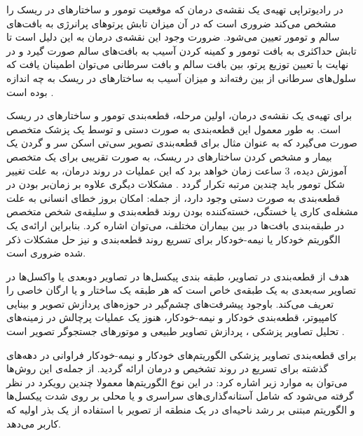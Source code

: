 در رادیوتراپی تهیه‌ی یک نقشه‌ی درمان که موقعیت تومور و ساختارهای در ریسک را مشخص می‌کند ضروری است که در آن میزان تابش پرتوهای پرانرژی به بافت‌های سالم و تومور تعیین می‌شود. ضرورت وجود این نقشه‌ی درمان به این دلیل است تا تابش حداکثری به بافت تومور و کمینه کردن آسیب به بافت‌های سالم صورت گیرد و در نهایت با تعیین توزیع پرتو، بین بافت سالم و بافت سرطانی می‌توان اطمینان یافت که سلول‌های سرطانی از بین رفته‌اند و میزان آسیب به ساختارهای در ریسک به چه اندازه بوده است .

برای تهیه‌ی یک نقشه‌ی درمان، اولین مرحله، قطعه‌بندی تومور و ساختار‌های در ریسک است. به طور معمول این قطعه‌بندی به صورت دستی و توسط یک پزشک متخصص صورت می‌گیرد که به عنوان مثال برای قطعه‌بندی تصویر سی‌تی اسکن سر و گردن یک بیمار و مشخص کردن ساختارهای در ریسک، به صورت تقریبی برای یک متخصص آموزش دیده، 3 ساعت زمان خواهد برد  که این عملیات در روند درمان، به علت تغییر شکل تومور باید چندین مرتبه تکرار گردد . مشکلات دیگری علاوه بر زمان‌بر بودن در قطعه‌بندی به صورت دستی وجود دارد، از جمله: امکان بروز خطای انسانی به علت مشغله‌ی کاری یا خستگی، خسته‌کننده بودن روند قطعه‌بندی و سلیقه‌ی شخص متخصص در طبقه‌بندی بافت‌ها در بین بیماران مختلف، می‌توان اشاره کرد. بنابراین ارائه‌ی یک الگوریتم خودکار یا نیمه-خودکار برای تسریع روند قطعه‌بندی و نیز حل مشکلات ذکر شده ضروری است. 


هدف از قطعه‌بندی در تصاویر، طبقه بندی پیکسل‌ها  در تصاویر دوبعدی  یا واکسل‌ها  در تصاویر سه‌بعدی  به یک طبقه‌ی خاص است که هر طبقه یک ساختار و یا ارگان خاصی را تعریف می‌کند. باوجود پیشرفت‌های چشم‌گیر در حوزه‌های پردازش تصویر   و بینایی کامپیوتر، قطعه‌بندی خودکار و نیمه-خودکار، هنوز یک عملیات پرچالش در زمینه‌های تحلیل تصاویر پزشکی  ، پردازش تصاویر طبیعی  و موتورهای جستجوگر تصویر است . 

برای قطعه‌بندی تصاویر پزشکی الگوریتم‌های خودکار و نیمه-خودکار فراوانی در دهه‌های گذشته برای تسریع در روند تشخیص و درمان ارائه گردید. از جمله‌ی این روش‌ها می‌توان به موارد زیر اشاره کرد:
   در این نوع الگوریتم‌ها معمولا چندین رویکرد در نظر گرفته می‌شود که شامل آستانه‌گذاری‌های سراسری و یا محلی  بر روی شدت پیکسل‌ها و الگوریتم مبتنی بر رشد ناحیه‌ای  در یک منطقه از تصویر با استفاده از یک بذر  اولیه که کاربر می‌دهد.
 
